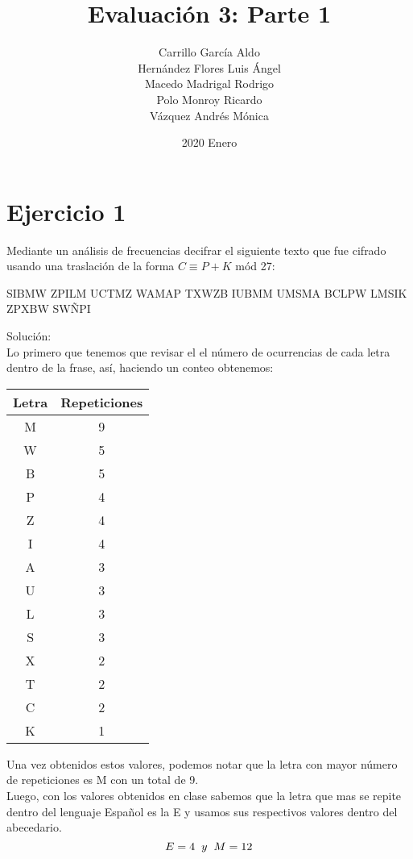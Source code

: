\documentclass[12pt]{article}
\title{Evaluación 3: Parte 1}
\date{2020 Enero}
\author{Carrillo García Aldo \\ Hernández Flores Luis Ángel \\ Macedo Madrigal Rodrigo \\ Polo Monroy Ricardo \\ Vázquez Andrés Mónica}
\begin{document}
\maketitle
\section{Ejercicio 1}
\par Mediante un análisis de frecuencias decifrar el siguiente texto que fue cifrado usando una traslación de la forma $C \equiv P + K$  mód 27: 
\begin{center}
    SIBMW ZPILM UCTMZ WAMAP TXWZB IUBMM UMSMA BCLPW LMSIK ZPXBW SWÑPI
\end{center}

\par Solución: \\
Lo primero que tenemos que revisar el el número de ocurrencias de cada letra dentro de la frase, así, haciendo un conteo obtenemos: 

\begin{center}
    \begin{tabular}{ |c|c|}
        \hline
            Letra & Repeticiones \\
        \hline
        M & 9 \\
        W & 5 \\
        B & 5 \\
        P & 4 \\
        Z & 4 \\
        I & 4 \\
        A & 3 \\
        U & 3 \\
        L & 3 \\
        S & 3 \\
        X & 2 \\ 
        T & 2 \\ 
        C & 2 \\ 
        K & 1 \\
        \hline
    \end{tabular}
\end{center}

Una vez obtenidos estos valores, podemos notar que la letra con mayor número de repeticiones es M con un total de 9. \\
Luego, con los valores obtenidos en clase sabemos que la letra que mas se repite dentro del lenguaje Español es la E y usamos sus respectivos valores dentro del abecedario.
\begin{equation}
    E = 4 \hspace{0.2cm} y \hspace{0.2cm} M = 12
\end{equation}
\end{document}
